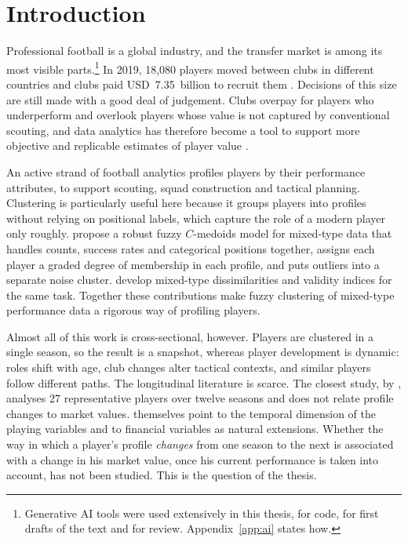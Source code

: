 \chapter{Introduction}
\label{ch:introduction}

Professional football is a global industry, and the transfer market is among its most visible parts.\footnote{Generative AI tools were used extensively in this thesis, for code, for first drafts of the text and for review. Appendix~\ref{app:ai} states how.} In 2019, 18,080 players moved between clubs in different countries and clubs paid USD~7.35~billion to recruit them \cite{franceschi2024determinants}. Decisions of this size are still made with a good deal of judgement. Clubs overpay for players who underperform and overlook players whose value is not captured by conventional scouting, and data analytics has therefore become a tool to support more objective and replicable estimates of player value \cite{muller2017beyond}.

An active strand of football analytics profiles players by their performance attributes, to support scouting, squad construction and tactical planning. Clustering is particularly useful here because it groups players into profiles without relying on positional labels, which capture the role of a modern player only roughly.  propose a robust fuzzy $C$-medoids model for mixed-type data that handles counts, success rates and categorical positions together, assigns each player a graded degree of membership in each profile, and puts outliers into a separate noise cluster.  develop mixed-type dissimilarities and validity indices for the same task. Together these contributions make fuzzy clustering of mixed-type performance data a rigorous way of profiling players.

Almost all of this work is cross-sectional, however. Players are clustered in a single season, so the result is a snapshot, whereas player development is dynamic: roles shift with age, club changes alter tactical contexts, and similar players follow different paths. The longitudinal literature is scarce. The closest study, by , analyses 27 representative players over twelve seasons and does not relate profile changes to market values.  themselves point to the temporal dimension of the playing variables and to financial variables as natural extensions. Whether the way in which a player's profile \emph{changes} from one season to the next is associated with a change in his market value, once his current performance is taken into account, has not been studied. This is the question of the thesis.

